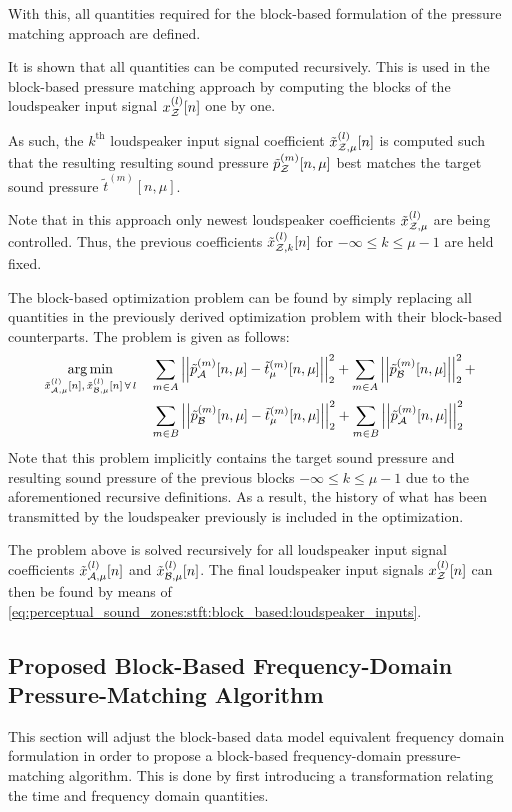 With this, all quantities required for the block-based formulation of the pressure matching approach are defined.

It is shown that all quantities can be computed recursively.
This is used in the block-based pressure matching approach by computing the blocks of the loudspeaker input signal
$x_{\mathcal{Z}}^{(l)}[n]$ one by one. 

As such, the $k^\text{th}$ loudspeaker input signal coefficient $\tilde{x}^{(l)}_{\mathcal{Z},\mu}[n]$ is computed such 
that the resulting resulting sound pressure $\tilde{p}_{\mathcal{Z}}^{(m)}[n, \mu]$ best matches the target sound pressure 
$\tilde{t}^{(m)}[n, \mu]$. 

Note that in this approach only newest loudspeaker coefficients $\tilde{x}^{(l)}_{\mathcal{Z},\mu}$ are being controlled. 
Thus, the previous coefficients $\tilde{x}^{(l)}_{\mathcal{Z},k}[n]$ for $-\infty \leq k \leq \mu - 1$ are held fixed.

The block-based optimization problem can be found by simply replacing all quantities in the previously derived optimization problem
with their block-based counterparts.
The problem is given as follows:
\begin{align}
    \begin{aligned}
        \argmin{\tilde{x}_{\za,\mu}^{(l)}[n],\,\tilde{x}_{\zb,\mu}^{(l)}[n]\,\forall\,l}{
           &\sum_{m\in A} \norm[2][2]{\tilde{p}_{\za}^{(m)}[n,\mu] - \tilde{t}_\mu^{(m)}[n,\mu]} +
           \sum_{m\in A} \norm[2][2]{\tilde{p}_{\zb}^{(m)}[n,\mu]} + \\
           &\sum_{m\in B} \norm[2][2]{\tilde{p}_{\zb}^{(m)}[n,\mu] - \tilde{t}_\mu^{(m)}[n,\mu]} + 
           \sum_{m\in B} \norm[2][2]{\tilde{p}_{\za}^{(m)}[n,\mu]}
        }
    \end{aligned}
\end{align}
Note that this problem implicitly contains the target sound pressure and resulting sound pressure of the previous blocks $-\infty \leq k \leq \mu - 1$ due to
the aforementioned recursive definitions.
As a result, the history of what has been transmitted by the loudspeaker previously is included in the optimization.

The problem above is solved recursively for all loudspeaker input signal coefficients $\tilde{x}_{\mathcal{A},\mu}^{(l)}[n]$ and $\tilde{x}_{\mathcal{B},\mu}^{(l)}[n]$.
The final loudspeaker input signals $x_{\mathcal{Z}}^{(l)}[n]$  can then be found by means of \autoref{eq:perceptual_sound_zones:stft:block_based:loudspeaker_inputs}.

\subsection{Proposed Block-Based Frequency-Domain Pressure-Matching Algorithm}
\label{ch:perceptual_sound_zones:stft:stft_pm}
This section will adjust the block-based data model equivalent frequency domain formulation in order to propose a block-based frequency-domain
pressure-matching algorithm.
This is done by first introducing a transformation relating the time and frequency domain quantities.

